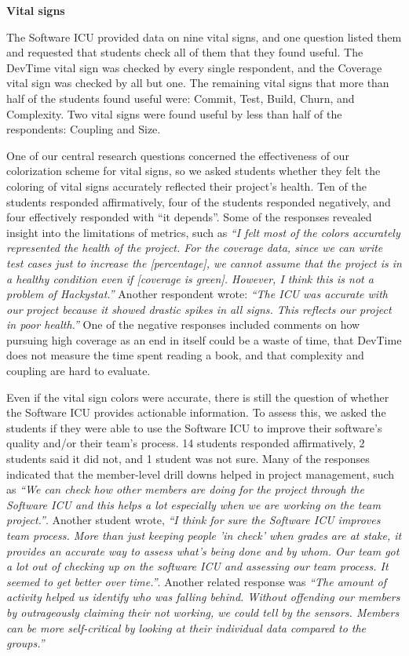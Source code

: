 \documentclass{acm_proc_article-sp}
\begin{document}
{\bf Vital signs}

The Software ICU provided data on nine vital signs, and one question listed
them and requested that students check all of them that they found useful.
The DevTime vital sign was checked by every single respondent, and the
Coverage vital sign was checked by all but one.  The remaining vital signs
that more than half of the students found useful were: Commit, Test, Build,
Churn, and Complexity.  Two vital signs were found useful by less than half of the
respondents: Coupling and Size.

One of our central research questions concerned the effectiveness of our
colorization scheme for vital signs, so we asked students whether they felt
the coloring of vital signs accurately reflected their project's health.
Ten of the students responded affirmatively, four of the students responded
negatively, and four effectively responded with ``it depends''.  Some of
the responses revealed insight into the limitations of metrics, such as
{\em ``I felt most of the colors accurately represented the health of the
project. For the coverage data, since we can write test cases just to
increase the [percentage], we cannot assume that the project is in a
healthy condition even if [coverage is green]. However, I think this is not
a problem of Hackystat.''}  Another respondent wrote: {\em ``The ICU was
accurate with our project because it showed drastic spikes in all signs.
This reflects our project in poor health.''}  One of the negative responses
included comments on how pursuing high coverage as an end in itself could
be a waste of time, that DevTime does not measure the time spent reading a
book, and that complexity and coupling are hard to evaluate.

Even if the vital sign colors were accurate, there is still the question of
whether the Software ICU provides actionable information. To assess this,
we asked the students if they were able to use the Software ICU to improve
their software's quality and/or their team's process.  14 students
responded affirmatively, 2 students said it did not, and 1 student was not
sure.  Many of the responses indicated that the member-level drill downs
helped in project management, such as {\em ``We can check how other members
are doing for the project through the Software ICU and this helps a lot
especially when we are working on the team project.''}.  Another student
wrote, {\em ``I think for sure the Software ICU improves team process. More
than just keeping people 'in check' when grades are at stake, it
provides an accurate way to assess what's being done and by whom. Our team
got a lot out of checking up on the software ICU and assessing our team
process. It seemed to get better over time.''}.  Another related response
was {\em ``The amount of activity helped us identify who was falling
behind. Without offending our members by outrageously claiming their not
working, we could tell by the sensors. Members can be more self-critical by
looking at their individual data compared to the groups.''}
\end{document}

